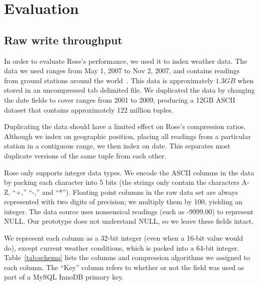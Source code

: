 \documentclass{vldb}
\newcommand{\rows}{Rose\xspace}
\newcommand{\rowss}{Rose's\xspace}
\begin{document}

\section{Evaluation}

\subsection{Raw write throughput}

In order to evaluate \rowss performance, we used it to index
weather data.  The data we used ranges from May 1,
2007 to Nov 2, 2007, and contains readings from ground stations around
the world~\cite{nssl}.  This data is approximately $1.3GB$ when stored in an
uncompressed tab delimited file.  We duplicated the data by changing
the date fields to cover ranges from 2001 to 2009, producing a 12GB
ASCII dataset that contains approximately 122 million tuples.

Duplicating the data should have a limited effect on \rowss
compression ratios.  Although we index on geographic position, placing
all readings from a particular station in a contiguous range, we then
index on date.  This separates most duplicate versions of the same tuple
from each other.

\rows only supports integer data types.  We encode the ASCII columns
in the data by packing each character into 5 bits (the strings only
contain the characters A-Z, ``+,'' ``-,'' and ``*'').  Floating point columns in
the raw data set are always represented with two digits of precision;
we multiply them by 100, yielding an integer.  The data source uses
nonsensical readings (such as -9999.00) to represent NULL.  Our
prototype does not understand NULL, so we leave these fields intact.

We represent each column as a 32-bit integer (even when a 16-bit value
would do), except current weather conditions, which is packed into a
64-bit integer.  Table~\ref{tab:schema} lists the columns and
compression algorithms we assigned to each column.  The ``Key'' column refers
to whether or not the field was used as part of a MySQL InnoDB primary key.
\end{document}
